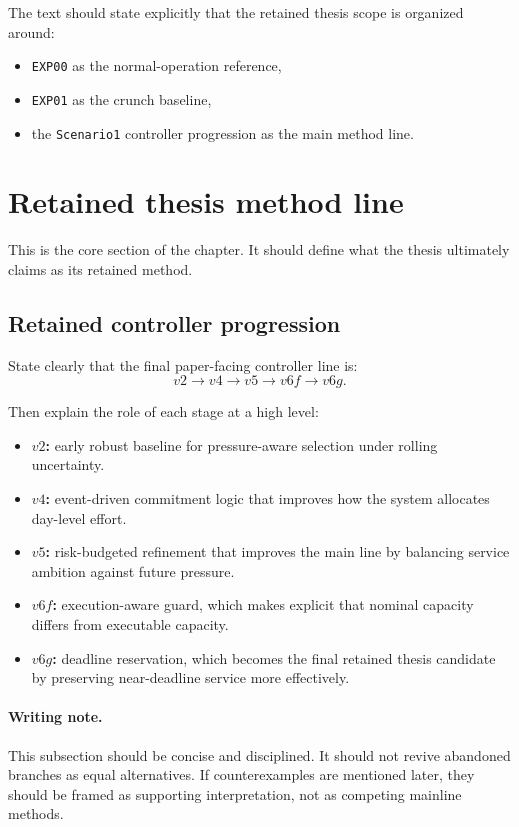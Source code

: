The text should state explicitly that the retained thesis scope is organized around:
\begin{itemize}
    \item \texttt{EXP00} as the normal-operation reference,
    \item \texttt{EXP01} as the crunch baseline,
    \item the \texttt{Scenario1} controller progression as the main method line.
\end{itemize}

\section{Retained thesis method line}
\label{sec:arch_retained_method_line}

This is the core section of the chapter. It should define what the thesis ultimately claims as its retained method.

\subsection{Retained controller progression}
\label{subsec:arch_controller_progression}

State clearly that the final paper-facing controller line is:
\begin{equation}
    v2 \rightarrow v4 \rightarrow v5 \rightarrow v6f \rightarrow v6g.
\end{equation}

Then explain the role of each stage at a high level:
\begin{itemize}
    \item \textbf{$v2$:} early robust baseline for pressure-aware selection under rolling uncertainty.
    \item \textbf{$v4$:} event-driven commitment logic that improves how the system allocates day-level effort.
    \item \textbf{$v5$:} risk-budgeted refinement that improves the main line by balancing service ambition against future pressure.
    \item \textbf{$v6f$:} execution-aware guard, which makes explicit that nominal capacity differs from executable capacity.
    \item \textbf{$v6g$:} deadline reservation, which becomes the final retained thesis candidate by preserving near-deadline service more effectively.
\end{itemize}

\paragraph{Writing note.}
This subsection should be concise and disciplined. It should not revive abandoned branches as equal alternatives. If counterexamples are mentioned later, they should be framed as supporting interpretation, not as competing mainline methods.

